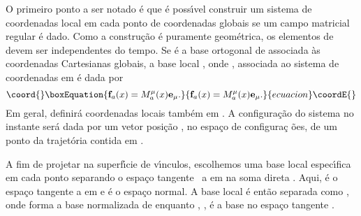 \documentclass[a4paper,thmsa,12pt]{report}
\begin{document}
O primeiro ponto a ser notado \'{e} que \'{e} poss\'{\i}vel construir um
sistema de coordenadas local em cada ponto \coordHE{} de coordenadas
globais \coordHE{} se um campo matricial regular \coordHE{} \'{e} dado.
Como a constru\c{c}\~{a}o \'{e} puramente geom\'{e}trica, os elementos de \coordHE{} devem ser independentes do tempo. Se \coordHE{} \'{e} a 
base ortogonal de \coordHE{} associada \`{a}s
coordenadas Cartesianas globais, a base local \coordHE{}, onde \coordHE{} , associada ao sistema de coordenadas em \coordHE{} \'{e} dada por 
\begin{equation}\coord{}\boxEquation{
\mathbf{f}_{a}(x)=M_{a}^{\mu }(x)\mathbf{e}_{\mu }.  \label{2}
}{
\mathbf{f}_{a}(x)=M_{a}^{\mu }(x)\mathbf{e}_{\mu }.  }{ecuacion}\coordE{}\end{equation}
Em geral, \coordHE{} definir\'{a} coordenadas locais tamb\'{e}m em \myHighlight{$%
\Sigma $}\coordHE{}. A configura\c{c}\~{a}o do sistema no instante \coordHE{} ser\'{a} dada
por um vetor posi\c{c}\~{a}o \coordHE{} , no espa\c{c}o de configura\c{c%
}\~{o}es, de um ponto da trajet\'{o}ria contida em \myHighlight{$\Sigma $}\coordHE{}.

A fim de projetar na superf\'{\i}cie de v\'{\i}nculos, escolhemos uma base
local espec\'{\i}fica em cada ponto \coordHE{} separando o espa\c{c}o
tangente \coordHE{} \ a \coordHE{} em \coordHE{} na soma direta \coordHE{}. Aqui,\coordHE{}
\'{e} o espa\c{c}o tangente a \myHighlight{$\Sigma $}\coordHE{} em \coordHE{} e \coordHE{} \'{e}
o espa\c{c}o normal. A base local \'{e} ent\~{a}o separada como \coordHE{}, onde \coordHE{}
forma a base normalizada de \coordHE{} enquanto \coordHE{}, \coordHE{} , \'{e} a base no espa\c{c}o tangente \coordHE{}%
.
\end{document}
